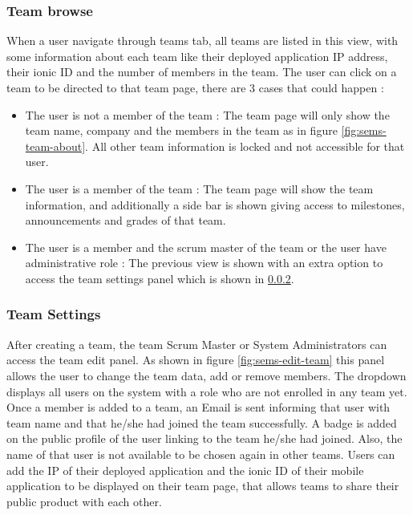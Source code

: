 \subsubsection{Team browse}
\label{subs:team-browse}
When a user navigate through teams tab, all teams are listed in this view, with some information about each team like their deployed application
IP address, their ionic ID  and the number of members in the team. The user can click on a team to
be directed to that team page, there are 3 cases that could happen :
\begin{itemize}
  \item The user is not a member of the team : The team page will only show the team name, company and the members in the team as in
  figure \ref{fig:sems-team-about}. All other team information is locked and not accessible for that user.
  \item The user is a member of the team : The team page will show the team information, and additionally a side bar is shown
  giving access to milestones, announcements and grades of that team.
  \item The user is a member and the scrum master of the team or the user have administrative role : The previous view is shown with an extra
  option to access the team settings panel which is shown in \ref{subs:team-settings}.
\end{itemize}

\subsubsection{Team Settings}
\label{subs:team-settings}
After creating a team, the team Scrum Master or System Administrators can access the team edit panel. As shown in figure \ref{fig:sems-edit-team}
this panel allows the user to change the team data, add or remove members. The  dropdown displays all users on the system
with a  role who are not enrolled in any team yet. Once a member is added to a team, an Email is sent informing that user
with team name and that he/she had joined the team successfully. A badge is added on the public profile of the user linking to the team he/she had joined.
Also, the name of that user is not available to be chosen again in other teams. Users can add the IP of their deployed application and the ionic ID of their
mobile application to be displayed on their team page, that allows teams to share their public product with each other.


